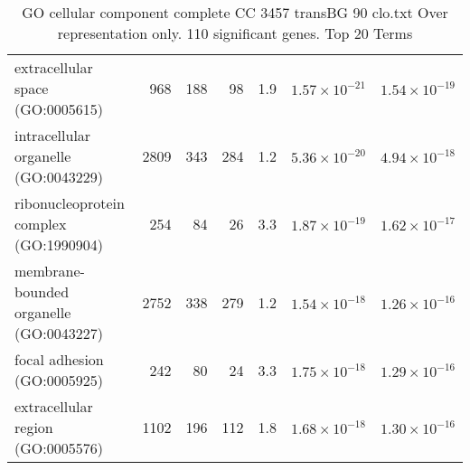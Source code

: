 \begin{table}[ht]
\begin{adjustbox}{width=\textwidth}
\begin{tabular}{lrrrrrr}
  extracellular space (GO:0005615) & 968 & 188 & 98 & 1.9 & $1.57 \times 10^{-21}$ & $1.54 \times 10^{-19}$ \\ 
  intracellular organelle (GO:0043229) & 2809 & 343 & 284 & 1.2 & $5.36 \times 10^{-20}$ & $4.94 \times 10^{-18}$ \\ 
  ribonucleoprotein complex (GO:1990904) & 254 & 84 & 26 & 3.3 & $1.87 \times 10^{-19}$ & $1.62 \times 10^{-17}$ \\ 
  membrane-bounded organelle (GO:0043227) & 2752 & 338 & 279 & 1.2 & $1.54 \times 10^{-18}$ & $1.26 \times 10^{-16}$ \\ 
  focal adhesion (GO:0005925) & 242 & 80 & 24 & 3.3 & $1.75 \times 10^{-18}$ & $1.29 \times 10^{-16}$ \\ 
  extracellular region (GO:0005576) & 1102 & 196 & 112 & 1.8 & $1.68 \times 10^{-18}$ & $1.30 \times 10^{-16}$ \\ 
   \hline
\end{tabular}
\end{adjustbox}
\caption{GO cellular component complete CC 3457 transBG 90 clo.txt Over representation only. 110 significant genes. Top 20 Terms} 
\label{tab:GO cellular component complete CC 3457 transBG 90 clo.txt Over representation only. 110 significant genes. Top 20 Terms}
\end{table}




